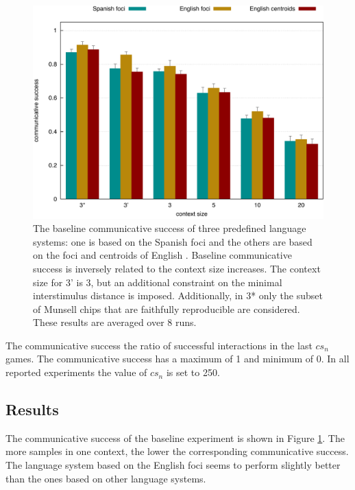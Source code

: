 \begin{figure}[p]
  \begin{center}
    \includegraphics[width=\textwidth]{./basic-strategy/figures/baseline.pdf}
    \caption[The baseline communicative success of three predefined
    language systems]{The baseline communicative success of three
      predefined language systems: one is based on the Spanish foci
      \citep{lillo07locating} and the others are based on the foci and
      centroids of English \citep{sturges95location}. Baseline
      communicative success is inversely related to the context size
      increases. The context size for 3' is 3, but an additional
      constraint on the minimal interstimulus distance is
      imposed. Additionally, in 3* only the subset of Munsell chips
      that are faithfully reproducible are considered. These results
      are averaged over 8 runs.}
    \label{f:bcs-baseline}
  \end{center}
\end{figure}

The communicative success
the ratio of
successful interactions in the last $cs_n$ games. The communicative
success has a maximum of 1 and minimum of 0. In all reported
experiments the value of $cs_n$ is set to 250.

\subsection{Results}

The communicative success of the baseline experiment is shown in
Figure \ref{f:bcs-baseline}. The more samples in one
context, the lower the corresponding communicative success. The
language system based on the English foci seems to perform slightly
better than the ones based on other language systems.


